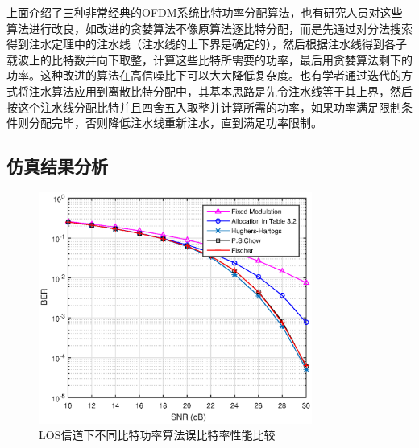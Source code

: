 上面介绍了三种非常经典的OFDM系统比特功率分配算法，也有研究人员对这些算法进行改良，如改进的贪婪算法不像原算法逐比特分配，而是先通过对分法搜索得到注水定理中的注水线（注水线的上下界是确定的\cite{余官定2005ofdm}），然后根据注水线得到各子载波上的比特数并向下取整，计算这些比特所需要的功率，最后用贪婪算法剩下的功率。这种改进的算法在高信噪比下可以大大降低复杂度。也有学者通过迭代的方式将注水算法应用到离散比特分配中，其基本思路是先令注水线等于其上界，然后按这个注水线分配比特并且四舍五入取整并计算所需的功率，如果功率满足限制条件则分配完毕，否则降低注水线重新注水，直到满足功率限制。

\subsection{仿真结果分析}
\begin{figure}[htbp]
\centering
\includegraphics[width=0.8\textwidth]{figures/chapter-4/BERonDiffAlgo.eps}
\caption{LOS信道下不同比特功率算法误比特率性能比较}
\label{fig:berOnDiffAlgo}
\end{figure}

